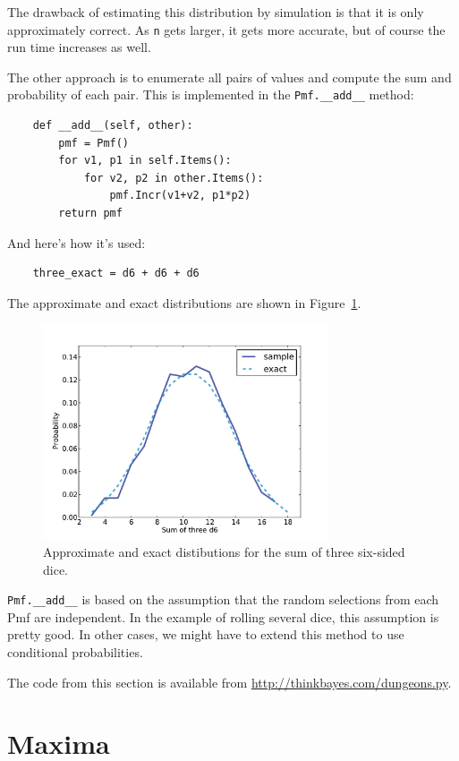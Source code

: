 \documentclass[12pt]{book}
\begin{document}
The drawback of estimating this distribution by simulation is that
it is only approximately correct.  As \verb"n" gets larger, it gets
more accurate, but of course the run time increases as well.

The other approach is to enumerate all pairs of values and
compute the sum and probability of each pair.  This is implemented
in the \verb"Pmf.__add__" method:

\begin{verbatim}
    def __add__(self, other):
        pmf = Pmf()
        for v1, p1 in self.Items():
            for v2, p2 in other.Items():
                pmf.Incr(v1+v2, p1*p2)
        return pmf
\end{verbatim}

And here's how it's used:

\begin{verbatim}
    three_exact = d6 + d6 + d6
\end{verbatim}

The approximate and exact distributions are shown in
Figure~\ref{fig.dungeons1}.

\begin{figure}
\centerline{\includegraphics[height=2.5in]{figs/dungeons1.pdf}}
\caption{Approximate and exact distibutions for the sum of
three six-sided dice.}
\label{fig.dungeons1}
\end{figure}

\verb"Pmf.__add__" is based on the assumption that the random
selections from each Pmf are independent.  In the example of rolling
several dice, this assumption is pretty good.  In other cases, we
might have to extend this method to use conditional probabilities.

The code from this section is available from
\url{http://thinkbayes.com/dungeons.py}.


\section{Maxima}
\end{document}
